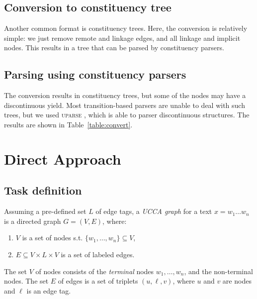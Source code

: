 \documentclass[11pt]{article}
\begin{document}
%
%
%

\subsection{Conversion to constituency tree}

Another common format is constituency trees. Here, the conversion is relatively simple: we just remove remote and linkage edges, and all linkage and implicit nodes. This results in a tree that can be parsed by constituency parsers.

\subsection{Parsing using constituency parsers}

The conversion results in constituency trees, but some of the nodes may have a discontinuous yield. Most transition-based parsers are unable to deal with such trees, but we used \textsc{uparse} \cite{maier2015discontinuous}, which is able to parser discontinuous structures. The results are shown in Table~\ref{table:convert}.

\section{Direct Approach}

\subsection{Task definition}

Assuming a pre-defined set $L$ of edge tags, a \textit{UCCA graph} for a text $x=w_1 \ldots w_n$ is a directed graph $G=(V,E)$, where:
\begin{enumerate}
 \item $V$ is a set of nodes s.t. $\{w_1, \ldots, w_n\} \subseteq V$,
 \item $E \subseteq V \times L \times V$ is a set of labeled edges.
\end{enumerate}
The set $V$ of nodes consists of the \textit{terminal} nodes $w_1, \ldots, w_n$, and the non-terminal nodes. The set $E$ of edges is a set of triplets $(u, \ell, v)$, where $u$ and $v$ are nodes and $\ell$ is an edge tag.
\end{document}

